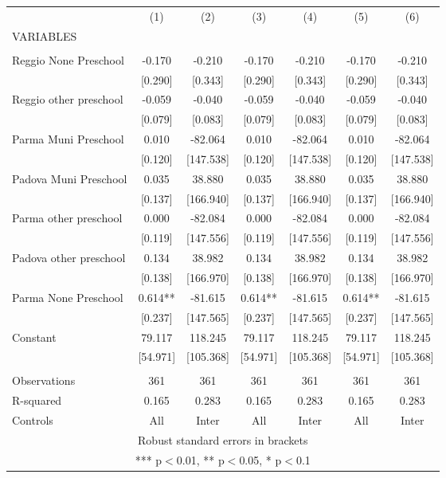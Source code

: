 \begin{tabular}{lcccccc} \hline
 & (1) & (2) & (3) & (4) & (5) & (6) \\
VARIABLES &  &  &  &  &  &  \\ \hline
 &  &  &  &  &  &  \\
Reggio None Preschool & -0.170 & -0.210 & -0.170 & -0.210 & -0.170 & -0.210 \\
 & [0.290] & [0.343] & [0.290] & [0.343] & [0.290] & [0.343] \\
Reggio other preschool & -0.059 & -0.040 & -0.059 & -0.040 & -0.059 & -0.040 \\
 & [0.079] & [0.083] & [0.079] & [0.083] & [0.079] & [0.083] \\
Parma Muni Preschool & 0.010 & -82.064 & 0.010 & -82.064 & 0.010 & -82.064 \\
 & [0.120] & [147.538] & [0.120] & [147.538] & [0.120] & [147.538] \\
Padova Muni Preschool & 0.035 & 38.880 & 0.035 & 38.880 & 0.035 & 38.880 \\
 & [0.137] & [166.940] & [0.137] & [166.940] & [0.137] & [166.940] \\
Parma other preschool & 0.000 & -82.084 & 0.000 & -82.084 & 0.000 & -82.084 \\
 & [0.119] & [147.556] & [0.119] & [147.556] & [0.119] & [147.556] \\
Padova other preschool & 0.134 & 38.982 & 0.134 & 38.982 & 0.134 & 38.982 \\
 & [0.138] & [166.970] & [0.138] & [166.970] & [0.138] & [166.970] \\
Parma None Preschool & 0.614** & -81.615 & 0.614** & -81.615 & 0.614** & -81.615 \\
 & [0.237] & [147.565] & [0.237] & [147.565] & [0.237] & [147.565] \\
Constant & 79.117 & 118.245 & 79.117 & 118.245 & 79.117 & 118.245 \\
 & [54.971] & [105.368] & [54.971] & [105.368] & [54.971] & [105.368] \\
 &  &  &  &  &  &  \\
Observations & 361 & 361 & 361 & 361 & 361 & 361 \\
R-squared & 0.165 & 0.283 & 0.165 & 0.283 & 0.165 & 0.283 \\
 Controls & All & Inter & All & Inter & All & Inter \\ \hline
\multicolumn{7}{c}{ Robust standard errors in brackets} \\
\multicolumn{7}{c}{ *** p$<$0.01, ** p$<$0.05, * p$<$0.1} \\
\end{tabular}
